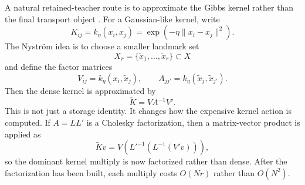 A natural retained-teacher route is to approximate the Gibbs kernel rather than
the final transport object \citep{altschuler2019nystrom}.  For a Gaussian-like
kernel, write
\begin{equation}
\label{eq:bf-learned-ot-nystrom-gibbs}
  K_{ij}
  =
  k_\eta(x_i,x_j)
  =
  \exp(-\eta\|x_i-x_j\|^2).
\end{equation}
The Nystr{\"o}m idea is to choose a smaller landmark set
\begin{equation}
\label{eq:bf-learned-ot-nystrom-landmarks}
  X_r=\{\tilde x_1,\ldots,\tilde x_r\}\subset X
\end{equation}
and define the factor matrices
\begin{equation}
\label{eq:bf-learned-ot-nystrom-factors}
  V_{ij}=k_\eta(x_i,\tilde x_j),
  \qquad
  A_{jj'}=k_\eta(\tilde x_j,\tilde x_{j'}).
\end{equation}
Then the dense kernel is approximated by
\begin{equation}
\label{eq:bf-learned-ot-nystrom-kernel}
  \widetilde K = V A^{-1}V'.
\end{equation}
This is not just a storage identity.  It changes how the expensive kernel action is
computed.  If \(A=LL'\) is a Cholesky factorization, then a matrix-vector product
is applied as
\begin{equation}
\label{eq:bf-learned-ot-nystrom-matvec}
  \widetilde K v
  =
  V\left(L'^{-1}\left(L^{-1}(V'v)\right)\right),
\end{equation}
so the dominant kernel multiply is now factorized rather than dense.  After the
factorization has been built, each multiply costs \(O(Nr)\) rather than
\(O(N^2)\).

